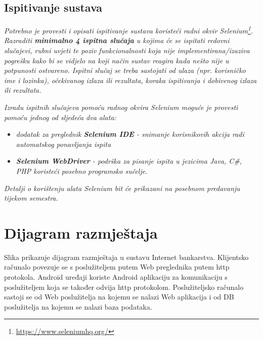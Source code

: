 			
			
			\subsection{Ispitivanje sustava}
			
			 \textit{Potrebno je provesti i opisati ispitivanje sustava koristeći radni okvir Selenium\footnote{\url{https://www.seleniumhq.org/}}. Razraditi \textbf{minimalno 4 ispitna slučaja} u kojima će se ispitati redovni slučajevi, rubni uvjeti te poziv funkcionalnosti koja nije implementirana/izaziva pogrešku kako bi se vidjelo na koji način sustav reagira kada nešto nije u potpunosti ostvareno. Ispitni slučaj se treba sastojati od ulaza (npr. korisničko ime i lozinka), očekivanog izlaza ili rezultata, koraka ispitivanja i dobivenog izlaza ili rezultata.\\ }
			 
			 \textit{Izradu ispitnih slučajeva pomoću radnog okvira Selenium moguće je provesti pomoću jednog od sljedeća dva alata:}
			 \begin{itemize}
			 	\item \textit{dodatak za preglednik \textbf{Selenium IDE} - snimanje korisnikovih akcija radi automatskog ponavljanja ispita	}
			 	\item \textit{\textbf{Selenium WebDriver} - podrška za pisanje ispita u jezicima Java, C\#, PHP koristeći posebno programsko sučelje.}
			 \end{itemize}
		 	\textit{Detalji o korištenju alata Selenium bit će prikazani na posebnom predavanju tijekom semestra.}
			
			\eject 
		
		
		\section{Dijagram razmještaja}
			
			Slika prikazuje dijagram razmještaja u sustavu Internet bankarstva. Klijentsko računalo povezuje se s poslužiteljem putem Web preglednika putem http protokola. Android uređaji koriste Android aplikaciju za komunikaciju s poslužiteljem koja se također odvija http protokolom. Poslužiteljsko računalo sastoji se od Web poslužitelja na kojemu se nalazi Web aplikacija i od DB poslužitelja na kojemu se nalazi baza podataka.
			
